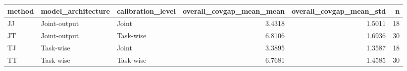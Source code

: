 \begin{tabular}{lllrrr}
\toprule
method & model_architecture & calibration_level & overall_covgap_mean_mean & overall_covgap_mean_std & n \\
\midrule
JJ & Joint-output & Joint & 3.4318 & 1.5011 & 18 \\
JT & Joint-output & Task-wise & 6.8106 & 1.6936 & 30 \\
TJ & Task-wise & Joint & 3.3895 & 1.3587 & 18 \\
TT & Task-wise & Task-wise & 6.7681 & 1.4585 & 30 \\
\bottomrule
\end{tabular}
